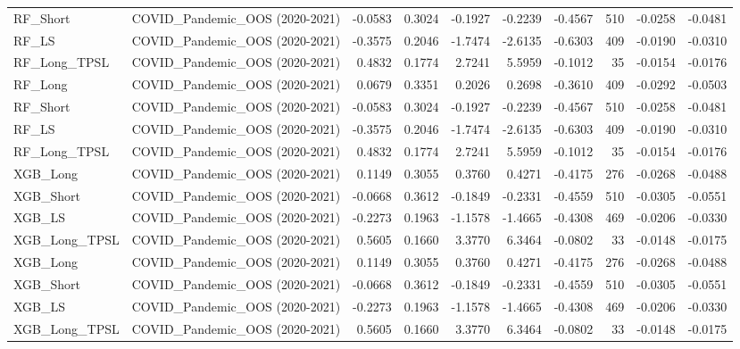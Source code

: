 \begin{tabular}{llrrrrrrrr}
\cline{1-10}
RF\_Short & COVID\_Pandemic\_OOS (2020-2021) & -0.0583 & 0.3024 & -0.1927 & -0.2239 & -0.4567 & 510 & -0.0258 & -0.0481 \\
\cline{1-10}
RF\_LS & COVID\_Pandemic\_OOS (2020-2021) & -0.3575 & 0.2046 & -1.7474 & -2.6135 & -0.6303 & 409 & -0.0190 & -0.0310 \\
\cline{1-10}
RF\_Long\_TPSL & COVID\_Pandemic\_OOS (2020-2021) & 0.4832 & 0.1774 & 2.7241 & 5.5959 & -0.1012 & 35 & -0.0154 & -0.0176 \\
\cline{1-10}
RF\_Long & COVID\_Pandemic\_OOS (2020-2021) & 0.0679 & 0.3351 & 0.2026 & 0.2698 & -0.3610 & 409 & -0.0292 & -0.0503 \\
\cline{1-10}
RF\_Short & COVID\_Pandemic\_OOS (2020-2021) & -0.0583 & 0.3024 & -0.1927 & -0.2239 & -0.4567 & 510 & -0.0258 & -0.0481 \\
\cline{1-10}
RF\_LS & COVID\_Pandemic\_OOS (2020-2021) & -0.3575 & 0.2046 & -1.7474 & -2.6135 & -0.6303 & 409 & -0.0190 & -0.0310 \\
\cline{1-10}
RF\_Long\_TPSL & COVID\_Pandemic\_OOS (2020-2021) & 0.4832 & 0.1774 & 2.7241 & 5.5959 & -0.1012 & 35 & -0.0154 & -0.0176 \\
\cline{1-10}
XGB\_Long & COVID\_Pandemic\_OOS (2020-2021) & 0.1149 & 0.3055 & 0.3760 & 0.4271 & -0.4175 & 276 & -0.0268 & -0.0488 \\
\cline{1-10}
XGB\_Short & COVID\_Pandemic\_OOS (2020-2021) & -0.0668 & 0.3612 & -0.1849 & -0.2331 & -0.4559 & 510 & -0.0305 & -0.0551 \\
\cline{1-10}
XGB\_LS & COVID\_Pandemic\_OOS (2020-2021) & -0.2273 & 0.1963 & -1.1578 & -1.4665 & -0.4308 & 469 & -0.0206 & -0.0330 \\
\cline{1-10}
XGB\_Long\_TPSL & COVID\_Pandemic\_OOS (2020-2021) & 0.5605 & 0.1660 & 3.3770 & 6.3464 & -0.0802 & 33 & -0.0148 & -0.0175 \\
\cline{1-10}
XGB\_Long & COVID\_Pandemic\_OOS (2020-2021) & 0.1149 & 0.3055 & 0.3760 & 0.4271 & -0.4175 & 276 & -0.0268 & -0.0488 \\
\cline{1-10}
XGB\_Short & COVID\_Pandemic\_OOS (2020-2021) & -0.0668 & 0.3612 & -0.1849 & -0.2331 & -0.4559 & 510 & -0.0305 & -0.0551 \\
\cline{1-10}
XGB\_LS & COVID\_Pandemic\_OOS (2020-2021) & -0.2273 & 0.1963 & -1.1578 & -1.4665 & -0.4308 & 469 & -0.0206 & -0.0330 \\
\cline{1-10}
XGB\_Long\_TPSL & COVID\_Pandemic\_OOS (2020-2021) & 0.5605 & 0.1660 & 3.3770 & 6.3464 & -0.0802 & 33 & -0.0148 & -0.0175 \\

\end{tabular}

